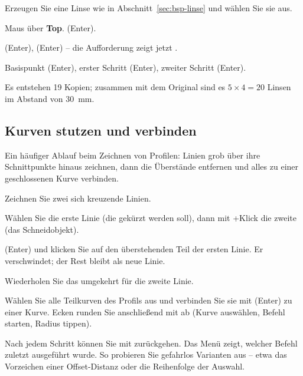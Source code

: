 \begin{schritte}
\item Erzeugen Sie eine Linse wie in Abschnitt~\ref{sec:bsp-linse} und wählen Sie sie aus.
\item Maus über \textbf{Top}.  (Enter).
\item {} (Enter),  (Enter) -- die Aufforderung zeigt jetzt
  .
\item Basispunkt  (Enter), erster Schritt  (Enter), zweiter Schritt
   (Enter).
\end{schritte}
Es entstehen 19 Kopien; zusammen mit dem Original sind es $5 \times 4 = 20$ Linsen im Abstand
von \SI{30}{mm}.

\subsection{Kurven stutzen und verbinden}\label{sec:bsp-trim}

Ein häufiger Ablauf beim Zeichnen von Profilen: Linien grob über ihre Schnittpunkte hinaus
zeichnen, dann die Überstände entfernen und alles zu einer geschlossenen Kurve verbinden.

\begin{schritte}
\item Zeichnen Sie zwei sich kreuzende Linien.
\item Wählen Sie die erste Linie (die gekürzt werden soll), dann mit +Klick die
  zweite (das Schneidobjekt).
\item {} (Enter) und klicken Sie auf den überstehenden Teil der ersten Linie. Er
  verschwindet; der Rest bleibt als neue Linie.
\item Wiederholen Sie das umgekehrt für die zweite Linie.
\item Wählen Sie alle Teilkurven des Profils aus und verbinden Sie sie mit  (Enter) zu
  einer Kurve. Ecken runden Sie anschließend mit  ab (Kurve auswählen, Befehl
  starten, Radius tippen).
\end{schritte}

\begin{tipp}
Nach jedem Schritt können Sie mit  zurückgehen. Das Menü  zeigt, welcher
Befehl zuletzt ausgeführt wurde. So probieren Sie gefahrlos Varianten aus -- etwa das
Vorzeichen einer Offset-Distanz oder die Reihenfolge der Auswahl.
\end{tipp}


